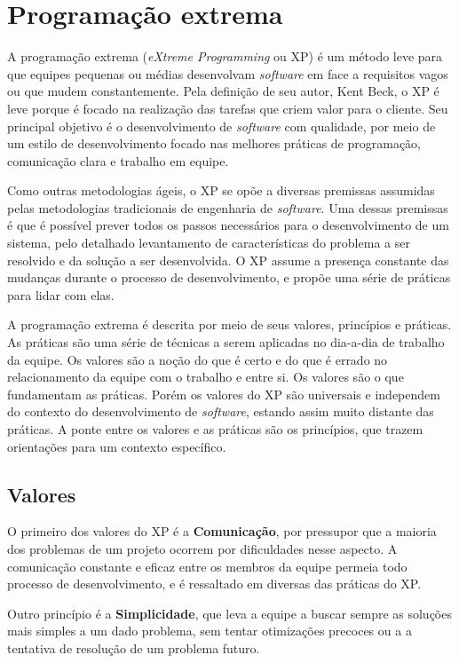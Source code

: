 \documentclass[a4paper,12pt,font=plain,header=plain]{abnt}
\begin{document}
\chapter{Programação extrema}
  A programação extrema (\textit{eXtreme Programming} ou XP) é um método leve para que equipes pequenas ou médias desenvolvam \textit{software} em face a requisitos vagos ou que mudem constantemente\cite{beck04}. Pela definição de seu autor, Kent Beck, o XP é leve porque é focado na realização das tarefas que criem valor para o cliente. Seu principal objetivo é o desenvolvimento de \textit{software} com qualidade, por meio de um estilo de desenvolvimento focado nas melhores práticas de programação, comunicação clara e trabalho em equipe.

  Como outras metodologias ágeis, o XP se opõe a diversas premissas assumidas pelas metodologias tradicionais de engenharia de \textit{software}. Uma dessas premissas é que é possível prever todos os passos necessários para o desenvolvimento de um sistema, pelo detalhado levantamento de características do problema a ser resolvido e da solução a ser desenvolvida. O XP assume a presença constante das mudanças durante o processo de desenvolvimento, e propõe uma série de práticas para lidar com elas.

  A programação extrema é descrita por meio de seus valores, princípios e práticas. As práticas são uma série de técnicas a serem aplicadas no dia-a-dia de trabalho da equipe. Os valores são a noção do que é certo e do que é errado no relacionamento da equipe com o trabalho e entre si. Os valores são o que fundamentam as práticas. Porém os valores do XP são universais e independem do contexto do desenvolvimento de \textit{software}, estando assim muito distante das práticas. A ponte entre os valores e as práticas são os princípios, que trazem orientações para um contexto específico.

  \section{Valores}
    O primeiro dos valores do XP é a \textbf{Comunicação}, por pressupor que a maioria dos problemas de um projeto ocorrem por dificuldades nesse aspecto. A comunicação constante e eficaz entre os membros da equipe permeia todo processo de desenvolvimento, e é ressaltado em diversas das práticas do XP.

    Outro princípio é a \textbf{Simplicidade}, que leva a equipe a buscar sempre as soluções mais simples a um dado problema, sem tentar otimizações precoces ou a a tentativa de resolução de um problema futuro.
\end{document}
